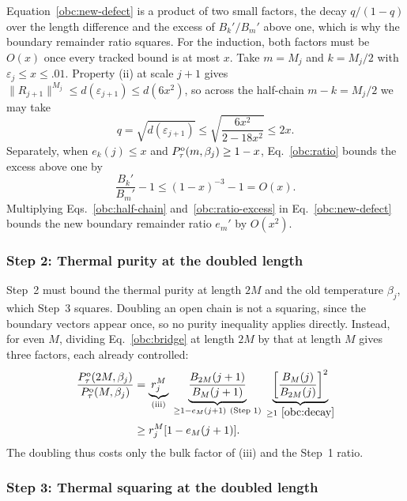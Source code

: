 Equation~\eqref{obc:new-defect} is a product of two small factors, the
decay $q/(1-q)$ over the length difference and the excess of
$B_k'/B_m'$ above one, which is why the boundary remainder ratio squares.
For the induction, both factors must be $O(x)$ once every tracked bound
is at most $x$. Take
$m=M_j$ and $k=M_j/2$ with $\varepsilon_j\le x\le.01$. Property (ii) at
scale $j+1$ gives $\|R_{j+1}\|^{M_j}\le d(\varepsilon_{j+1})\le d(6x^2)$,
so across the half-chain $m-k=M_j/2$ we may take
\begin{equation}
    q=\sqrt{d(\varepsilon_{j+1})}
    \le\sqrt{\frac{6x^2}{2-18x^2}}\le2x.
    \label{obc:half-chain}
\end{equation}
Separately, when $e_k(j)\le x$ and
$P_{\tau}^{\mathrm{o}}(m,\beta_j)\ge1-x$, Eq.~\eqref{obc:ratio} bounds the excess above one by
\begin{equation}
    \frac{B_k'}{B_m'}-1\le(1-x)^{-3}-1=O(x).
    \label{obc:ratio-excess}
\end{equation}
Multiplying Eqs.~\eqref{obc:half-chain} and~\eqref{obc:ratio-excess}
in Eq.~\eqref{obc:new-defect} bounds the new boundary remainder ratio $e_m'$ by
$O(x^2)$.

\subsubsection{Step 2: Thermal purity at the doubled length}
\label{obc:move-two}

Step~2 must bound the thermal purity at length $2M$ and the old
temperature $\beta_j$, which Step~3 squares. Doubling an open chain is
not a squaring, since the boundary vectors appear once, so no purity
inequality applies directly. Instead, for even $M$, dividing
Eq.~\eqref{obc:bridge} at length $2M$ by that at length $M$ gives three
factors, each already controlled:
\begin{align}
    \frac{\Pt^{\opp}(2M,\beta_j)}{\Pt^{\opp}(M,\beta_j)}
     &=\underbrace{r_j^M}_{\text{(iii)}}\;
    \underbrace{\frac{B_{2M}(j+1)}{B_M(j+1)}}_{\ge1-e_M(j+1)\ \text{(Step 1)}}\;
    \underbrace{\left[\frac{B_M(j)}{B_{2M}(j)}\right]^2}_{\ge1\ \eqref{obc:decay}}\notag\\
     &\ge r_j^M[1-e_M(j+1)].
    \label{obc:length}
\end{align}
The doubling thus costs only the bulk factor of (iii) and the Step~1
ratio.

\subsubsection{Step 3: Thermal squaring at the doubled length}
\label{obc:move-three}

